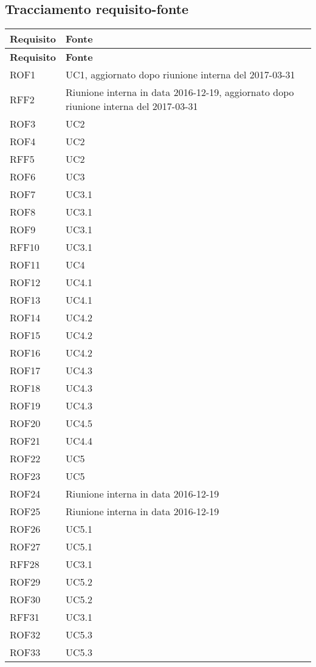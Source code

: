 \documentclass[../AnalisiDeiRequisiti_v4.0.0.tex]{subfiles}
\begin{document}
\subsection{Tracciamento requisito-fonte}
\def\arraystretch{1.5}
\begin{longtable}{p{4cm}!{\VRule[1pt]}p{4cm}}
\color{white} \textbf{Requisito} & \color{white} \textbf{Fonte} \\ 
\endfirsthead 
{} 
\color{white} \textbf{Requisito} & \color{white} \textbf{Fonte} \\ 
\endhead 
ROF1 & UC1, aggiornato dopo riunione interna del 2017-03-31\\
RFF2 & Riunione interna in data 2016-12-19, aggiornato dopo riunione interna del 2017-03-31 \\
ROF3 & UC2 \\
ROF4 & UC2 \\
RFF5 & UC2 \\
ROF6 & UC3 \\
ROF7 & UC3.1 \\
ROF8 & UC3.1 \\
ROF9 & UC3.1 \\
RFF10 & UC3.1 \\
ROF11 & UC4 \\
ROF12 & UC4.1 \\
ROF13 & UC4.1 \\
ROF14 & UC4.2 \\
ROF15 & UC4.2 \\
ROF16 & UC4.2 \\
ROF17 & UC4.3 \\
ROF18 & UC4.3 \\
ROF19 & UC4.3 \\
ROF20 & UC4.5 \\
ROF21 & UC4.4 \\
ROF22 & UC5 \\
ROF23 & UC5 \\
ROF24 & Riunione interna in data 2016-12-19 \\
ROF25 & Riunione interna in data 2016-12-19 \\
ROF26 & UC5.1 \\
ROF27 & UC5.1 \\
RFF28 & UC3.1 \\
ROF29 & UC5.2 \\
ROF30 & UC5.2 \\
RFF31 & UC3.1 \\
ROF32 & UC5.3 \\
ROF33 & UC5.3 \\

\end{longtable}
\end{document}
